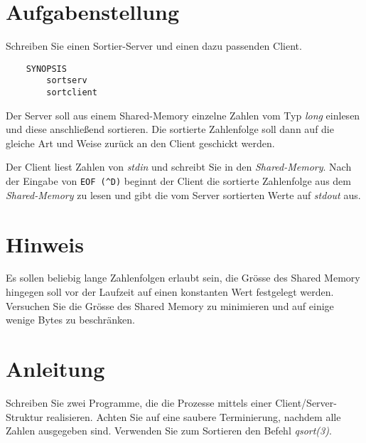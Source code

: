 




\section*{Aufgabenstellung}

Schreiben Sie einen Sortier-Server und einen dazu passenden Client.
\begin{verbatim}
    SYNOPSIS
        sortserv
        sortclient
\end{verbatim}
Der Server soll aus einem Shared-Memory einzelne Zahlen vom Typ \emph{long} einlesen und
diese anschließend sortieren. Die sortierte Zahlenfolge soll dann auf die gleiche Art und
Weise zur\"uck an den Client geschickt werden.

Der Client liest Zahlen von \emph{stdin} und schreibt Sie in den \emph{Shared-Memory}.
Nach der Eingabe von \verb|EOF (^D)| beginnt der Client die sortierte Zahlenfolge aus dem
\emph{Shared-Memory} zu lesen und gibt die vom Server sortierten Werte auf {\em stdout} aus.

\section*{Hinweis}
Es sollen beliebig lange Zahlenfolgen erlaubt sein, die Gr\"osse des Shared Memory hingegen soll vor der Laufzeit auf einen konstanten Wert festgelegt werden. Versuchen Sie die Gr\"osse des Shared Memory zu minimieren und auf einige wenige Bytes zu beschr\"anken.

\section*{Anleitung}
Schreiben Sie zwei Programme, die die Prozesse mittels einer Client/Server-Struktur realisieren. Achten Sie auf eine saubere Terminierung, nachdem alle Zahlen ausgegeben sind. Verwenden Sie zum Sortieren den Befehl \emph{qsort(3)}.

\osueguidelinesthree


